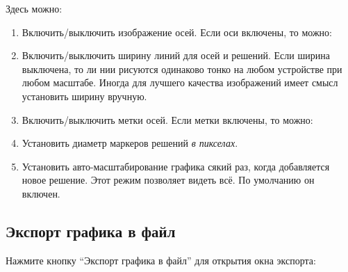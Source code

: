 \documentclass[12pt]{article}
\begin{document}
Здесь можно:
\begin{enumerate}
\item Включить/выключить изображение осей. Если оси включены, то можно:

\item Включить/выключить ширину линий для осей и решений. 
Если ширина выключена, то ли нии рисуются одинаково тонко на 
любом устройстве при любом масштабе.
Иногда для лучшего качества изображений имеет смысл установить ширину вручную.

\item Включить/выключить метки осей. Если метки включены, то можно:

\item Установить диаметр маркеров решений \textit{в пикселах}.

\item Установить авто-масштабирование графика сякий раз, 
когда добавляется новое решение.
Этот режим позволяет видеть всё. По умолчанию он включен.
\end{enumerate}


\subsection{Экспорт графика в файл}

Нажмите кнопку ``Экспорт графика в файл''  для открытия окна экспорта:

\end{document}
